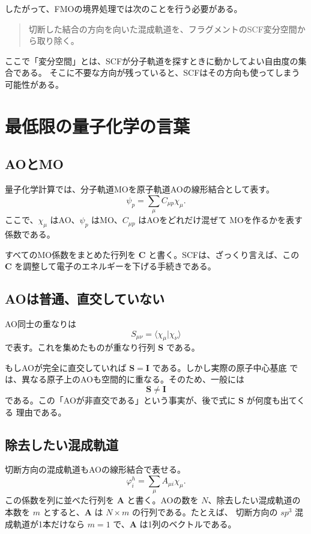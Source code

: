 \documentclass[uplatex,dvipdfmx,11pt]{jsarticle}
\newcommand{\Smat}{\mathbf S}
\newcommand{\Amat}{\mathbf A}
\newcommand{\Cmat}{\mathbf C}
\begin{document}
したがって、FMOの境界処理では次のことを行う必要がある。

\begin{quote}
切断した結合の方向を向いた混成軌道を、フラグメントのSCF変分空間から取り除く。
\end{quote}

ここで「変分空間」とは、SCFが分子軌道を探すときに動かしてよい自由度の集合である。
そこに不要な方向が残っていると、SCFはその方向も使ってしまう可能性がある。

\section{最低限の量子化学の言葉}

\subsection{AOとMO}

量子化学計算では、分子軌道MOを原子軌道AOの線形結合として表す。
\[
  \psi_p = \sum_\mu C_{\mu p}\chi_\mu .
\]
ここで、\(\chi_\mu\) はAO、\(\psi_p\) はMO、\(C_{\mu p}\) はAOをどれだけ混ぜて
MOを作るかを表す係数である。

すべてのMO係数をまとめた行列を \(\Cmat\) と書く。SCFは、ざっくり言えば、この
\(\Cmat\) を調整して電子のエネルギーを下げる手続きである。

\subsection{AOは普通、直交していない}

AO同士の重なりは
\[
  S_{\mu\nu} = \langle \chi_\mu | \chi_\nu \rangle
\]
で表す。これを集めたものが重なり行列 \(\Smat\) である。

もしAOが完全に直交していれば \(\Smat=\mathbf I\) である。しかし実際の原子中心基底
では、異なる原子上のAOも空間的に重なる。そのため、一般には
\[
  \Smat \ne \mathbf I
\]
である。この「AOが非直交である」という事実が、後で式に \(\Smat\) が何度も出てくる
理由である。

\subsection{除去したい混成軌道}

切断方向の混成軌道もAOの線形結合で表せる。
\[
  \varphi_i^h = \sum_\mu A_{\mu i}\chi_\mu .
\]
この係数を列に並べた行列を \(\Amat\) と書く。AOの数を \(N\)、除去したい混成軌道の
本数を \(m\) とすると、\(\Amat\) は \(N\times m\) の行列である。たとえば、
切断方向の \(sp^3\) 混成軌道が1本だけなら \(m=1\) で、\(\Amat\) は1列のベクトルである。
\end{document}
